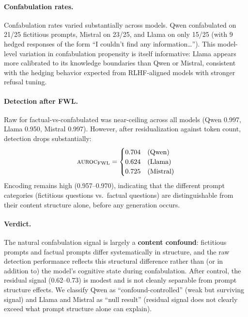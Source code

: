 \paragraph{Confabulation rates.}
Confabulation rates varied substantially across models.
Qwen confabulated on 21/25 fictitious prompts, Mistral on 23/25, and Llama on only 15/25 (with 9 hedged responses of the form ``I couldn't find any information\ldots'').
This model-level variation in confabulation propensity is itself informative: Llama appears more calibrated to its knowledge boundaries than Qwen or Mistral, consistent with the hedging behavior expected from RLHF-aligned models with stronger refusal tuning.

\paragraph{Detection after FWL.}
Raw \auroc for factual-vs-confabulated was near-ceiling across all models (Qwen 0.997, Llama 0.950, Mistral 0.997).
However, after \fwl residualization against token count, detection drops substantially:
\begin{equation*}
  \text{\textsc{auroc}}_{\text{FWL}} =
  \begin{cases}
    0.704 & \text{(Qwen)} \\
    0.624 & \text{(Llama)} \\
    0.725 & \text{(Mistral)}
  \end{cases}
\end{equation*}
Encoding \auroc remains high (0.957--0.970), indicating that the different prompt categories (fictitious questions vs.\ factual questions) are distinguishable from their content structure alone, before any generation occurs.

\paragraph{Verdict.}
The natural confabulation signal is largely a \textbf{content confound}: fictitious prompts and factual prompts differ systematically in structure, and the raw detection performance reflects this structural difference rather than (or in addition to) the model's cognitive state during confabulation.
After \fwl control, the residual signal (0.62--0.73) is modest and is not cleanly separable from prompt structure effects.
We classify Qwen as ``confound-controlled'' (weak but surviving signal) and Llama and Mistral as ``null result'' (residual signal does not clearly exceed what prompt structure alone can explain).

